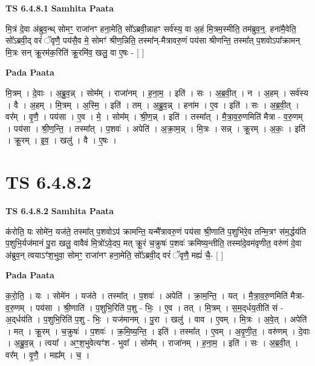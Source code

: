 \documentclass[17pt]{extarticle}
\begin{document}
\textbf{TS 6.4.8.1 } \newline
\textbf{Samhita Paata} \newline

मि॒त्रं दे॒वा अ॑ब्रुव॒न्थ् सोमꣳ॒॒ राजा॑नꣳ हना॒मेति॒ सो᳚ऽब्रवी॒न्नाहꣳ सर्व॑स्य॒ वा अ॒हं मि॒त्रम॒स्मीति॒ तम॑ब्रुव॒न्॒. हना॑मै॒वेति॒ सो᳚ऽब्रवी॒द् वरं॑ ॅवृणै॒ पय॑सै॒व मे॒ सोमꣳ॑ श्रीण॒न्निति॒ तस्मा᳚न्-मैत्रावरु॒णं पय॑सा श्रीणन्ति॒ तस्मा᳚त् प॒शवोऽपा᳚क्रामन् मि॒त्रः सन् क्रू॒रम॑क॒रिति॑ क्रू॒रमि॑व॒ खलु॒ वा ए॒षः - [  ] \newline

\textbf{Pada Paata} \newline

मि॒त्रम् । दे॒वाः । अ॒ब्रु॒व॒न्न् । सोम᳚म् । राजा॑नम् । ह॒ना॒म॒ । इति॑ । सः । अ॒ब्र॒वी॒त् । न । अ॒हम् । सर्व॑स्य । वै । अ॒हम् । मि॒त्रम् । अ॒स्मि॒ । इति॑ । तम् । अ॒ब्रु॒व॒न्न् । हना॑म । ए॒व । इति॑ । सः । अ॒ब्र॒वी॒त् । वर᳚म् । वृ॒णै॒ । पय॑सा । ए॒व । मे॒ । सोम᳚म् । श्री॒ण॒न्न् । इति॑ । तस्मा᳚त् । मै॒त्रा॒व॒रु॒णमिति॑ मैत्रा - व॒रु॒णम् । पय॑सा । श्री॒ण॒न्ति॒ । तस्मा᳚त् । प॒शवः॑ । अपेति॑ । अ॒क्रा॒म॒न्न् । मि॒त्रः । सन्न् । क्रू॒रम् । अ॒कः॒ । इति॑ । क्रू॒रम् । इ॒व॒ । खलु॑ । वै । ए॒षः ।  \newline




\section*{ TS 6.4.8.2 }

\textbf{TS 6.4.8.2 } \newline
\textbf{Samhita Paata} \newline

क॑रोति॒ यः सोमे॑न॒ यज॑ते॒ तस्मा᳚त् प॒शवोऽप॑ क्रामन्ति॒ यन्मै᳚त्रावरु॒णं पय॑सा श्री॒णाति॑ प॒शुभि॑रे॒व तन्मि॒त्रꣳ स॑म॒र्द्धय॑ति प॒शुभि॒र्यज॑मानं पु॒रा खलु॒ वावैवं मि॒त्रो॑ऽवे॒दप॒ मत् क्रू॒रं च॒क्रुषः॑ प॒शवः॑ क्रमिष्य॒न्तीति॒ तस्मा॑दे॒वम॑वृणीत॒ वरु॑णं दे॒वा अ॑ब्रुव॒न् त्वयाऽꣳ॑श॒भुवा॒ सोमꣳ॒॒ राजा॑नꣳ हना॒मेति॒ सो᳚ऽब्रवी॒द् वरं॑ ॅवृणै॒ मह्यं॑ चै॒- [  ] \newline

\textbf{Pada Paata} \newline

क॒रो॒ति॒ । यः । सोमे॑न । यज॑ते । तस्मा᳚त् । प॒शवः॑ । अपेति॑ । क्रा॒म॒न्ति॒ । यत् । मै॒त्रा॒व॒रु॒णमिति॑ मैत्रा-व॒रु॒णम् । पय॑सा । श्री॒णाति॑ । प॒शुभि॒रिति॑ प॒शु - भिः॒ । ए॒व । तत् । मि॒त्रम् । स॒म॒द्‌र्धय॒तीति॑ सं - अ॒द्‌र्धय॑ति । प॒शुभि॒रिति॑ प॒शु - भिः॒ । यज॑मानम् । पु॒रा । खलु॑ । वाव । ए॒वम् । मि॒त्रः । अ॒वे॒त् । अपेति॑ । मत् । क्रू॒रम् । च॒क्रुषः॑ । प॒शवः॑ । क्र॒मि॒ष्य॒न्ति॒ । इति॑ । तस्मा᳚त् । ए॒वम् । अ॒वृ॒णी॒त॒ । वरु॑णम् । दे॒वाः । अ॒ब्रु॒व॒न्न् । त्वया᳚ । अꣳ॒॒श॒भुवेत्यꣳ॑श - भुवा᳚ । सोम᳚म् । राजा॑नम् । ह॒ना॒म॒ । इति॑ । सः । अ॒ब्र॒वी॒त् । वर᳚म् । वृ॒णै॒ । मह्य᳚म् । च॒ ।  \newline
\end{document}
